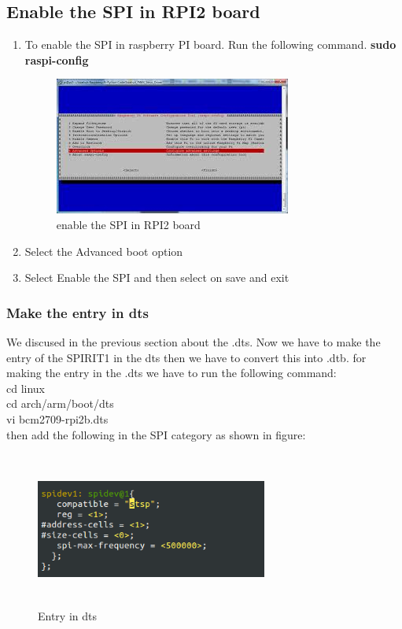 \subsection{Enable the SPI in RPI2 board}
	\begin{enumerate}
		\item To enable the SPI in raspberry PI board. Run the following command.
			\textbf{sudo raspi-config}
			\begin{figure}[ht]
				\centering
				\includegraphics[scale=1.2]{images/spi.png}
				\caption{enable the SPI in RPI2 board}
			\end{figure}
		\item Select the Advanced boot option
		\item Select Enable the SPI and then select on save and exit
	\end{enumerate}
\subsubsection{Make the entry in dts}
We discused in the previous section about the .dts. Now we have to make the entry of the SPIRIT1 in the dts then we have to convert this into .dtb. 
for making the entry in the .dts we have to run the following command:\\
cd linux\\
cd arch/arm/boot/dts\\
vi bcm2709-rpi2b.dts\\
then add the following in the SPI category as shown in figure:\\
\begin{figure}[H]
	\centering
	\includegraphics[width=3in, height=2in]{images/dts.png}
	\caption{Entry in dts}
\end{figure}
